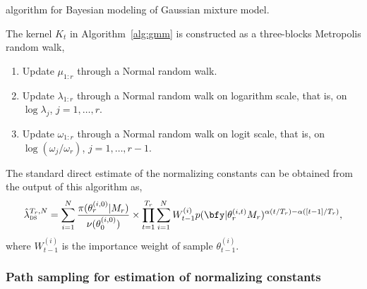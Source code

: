 \documentclass[11pt, fontset=Minion, showoverfull,
bib, biblatexstyle=numeric, mintcode, minted=cache]{marticle}
\begin{document}
\begin{algorithm}[t]
\caption{\smc algorithm for Bayesian modeling of Gaussian mixture
  model.}
\label{alg:gmm}
\end{algorithm}

The \mcmc kernel $K_t$ in Algorithm~\ref{alg:gmm} is constructed as a
three-blocks Metropolis random walk,
\begin{enumerate}
  \item Update $\mu_{1:r}$ through a Normal random walk.
  \item Update $\lambda_{1:r}$ through a Normal random walk on logarithm
    scale, that is, on $\log\lambda_{j}$, $j = 1, \dots, r$.
  \item Update $\omega_{1:r}$ through a Normal random walk on logit scale,
    that is, on $\log(\omega_{j}/\omega_r)$, $j = 1,\dots,r-1$.
\end{enumerate}

The standard direct estimate of the normalizing constants
\cite{DelMoral:2006hc} can be obtained from the output of this \smc algorithm
as,
\begin{equation}
  \hat\lambda_{\text{\textsc{ds}}}^{T_r,N} =
  \sum_{i=1}^N \frac{\pi(\theta_r^{(i,0)}|M_r)}{\nu(\theta_0^{(i,0)})} \times
  \prod_{t=1}^{T_r} \sum_{i=1}^N W_{t-1}^{(i)}
  p(\bfy|\theta_r^{(i,t)}M_r)^{\alpha(t/T_r) - \alpha([t-1]/T_r)},
  \label{eq:smc-ds}
\end{equation}
where $W_{t-1}^{(i)}$ is the importance weight of sample $\theta_{t-1}^{(i)}$.

\subsubsection{Path sampling for estimation of normalizing constants}
\end{document}
